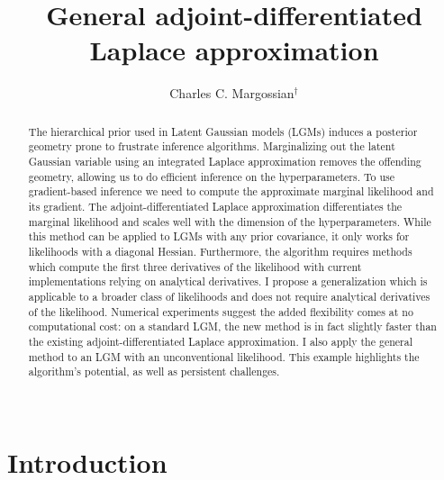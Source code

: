 \documentclass[stslayout, noinfoline]{imsart}
\theoremstyle{definition}
\begin{document}
\begin{frontmatter}

\title{General adjoint-differentiated Laplace approximation}

\begin{aug}
\author{Charles C. Margossian$^\dagger$}
  \address{$^\dagger$Flatiron Institute, Center for Computational Mathematics.
  This article originally appeared in the author's PhD thesis \citep{Margossian:2022}. 
  Work mostly done  while at Columbia University, Department of Statistics. This version contains some minor revisions.
  Contact: cmargossian@flatironinstitute.org}
\end{aug}

\begin{abstract}
The hierarchical prior used in Latent Gaussian models (LGMs) induces a posterior geometry prone to frustrate inference algorithms.
Marginalizing out the latent Gaussian variable using an integrated Laplace approximation removes the offending geometry, allowing us to do efficient inference on the hyperparameters.
To use gradient-based inference we need to compute the approximate marginal likelihood and its gradient.
The adjoint-differentiated Laplace approximation differentiates the marginal likelihood and scales well with the dimension of the hyperparameters. 
While this method can be applied to LGMs with any prior covariance, it only works for likelihoods with a diagonal Hessian.
Furthermore, the algorithm requires methods which compute the first three derivatives of the likelihood with current implementations relying on analytical derivatives.
I propose a generalization which is applicable to a broader class of likelihoods and does not require analytical derivatives of the likelihood.
Numerical experiments suggest the added flexibility comes at no computational cost: on a standard LGM, the new method is in fact slightly faster than the existing adjoint-differentiated Laplace approximation.
I also apply the general method to an LGM with an unconventional likelihood.
This example highlights the algorithm's potential, as well as persistent challenges. \\ \ \\
\end{abstract}

\end{frontmatter}

\section{Introduction}
\end{document}
